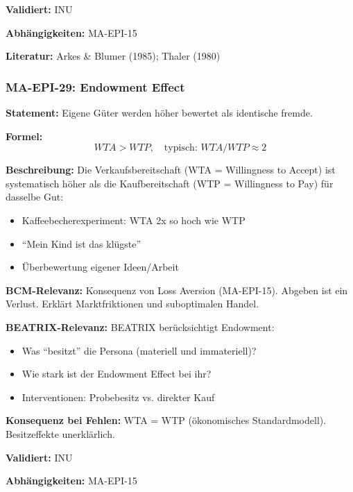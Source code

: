 \textbf{Validiert:} INU

\textbf{Abhängigkeiten:} MA-EPI-15

\textbf{Literatur:} Arkes \& Blumer (1985); Thaler (1980)


\subsubsection*{MA-EPI-29: Endowment Effect}

\textbf{Statement:} Eigene Güter werden höher bewertet als identische fremde.

\textbf{Formel:}
\begin{equation}
WTA > WTP, \quad \text{typisch: } WTA/WTP \approx 2
\end{equation}

\textbf{Beschreibung:}
Die Verkaufsbereitschaft (WTA = Willingness to Accept) ist systematisch höher als die Kaufbereitschaft (WTP = Willingness to Pay) für dasselbe Gut:
\begin{itemize}
    \item Kaffeebecherexperiment: WTA 2x so hoch wie WTP
    \item ``Mein Kind ist das klügste''
    \item Überbewertung eigener Ideen/Arbeit
\end{itemize}

\textbf{BCM-Relevanz:}
Konsequenz von Loss Aversion (MA-EPI-15). Abgeben ist ein Verlust. Erklärt Marktfriktionen und suboptimalen Handel.

\textbf{BEATRIX-Relevanz:}
BEATRIX berücksichtigt Endowment:
\begin{itemize}
    \item Was ``besitzt'' die Persona (materiell und immateriell)?
    \item Wie stark ist der Endowment Effect bei ihr?
    \item Interventionen: Probebesitz vs. direkter Kauf
\end{itemize}

\textbf{Konsequenz bei Fehlen:}
WTA = WTP (ökonomisches Standardmodell). Besitzeffekte unerklärlich.

\textbf{Validiert:} INU

\textbf{Abhängigkeiten:} MA-EPI-15

